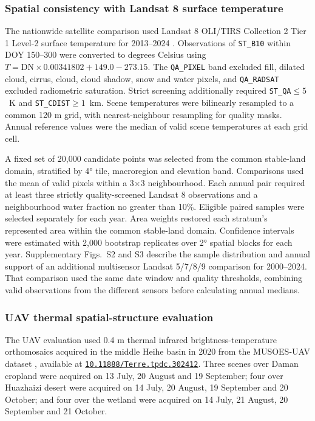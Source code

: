 \subsubsection{Spatial consistency with Landsat 8 surface temperature}

The nationwide satellite comparison used Landsat 8 OLI/TIRS Collection 2 Tier 1 Level-2 surface temperature for 2013--2024 \parencite{malakar2018landsatSt,ermida2020landsatGee,usgs2021collection2}. Observations of \texttt{ST\_B10} within DOY 150--300 were converted to degrees Celsius using $T=\mathrm{DN}\times0.00341802+149.0-273.15$. The \texttt{QA\_PIXEL} band excluded fill, dilated cloud, cirrus, cloud, cloud shadow, snow and water pixels, and \texttt{QA\_RADSAT} excluded radiometric saturation. Strict screening additionally required \texttt{ST\_QA}$\leq5$~K and \texttt{ST\_CDIST}$\geq1$~km. Scene temperatures were bilinearly resampled to a common 120 m grid, with nearest-neighbour resampling for quality masks. Annual reference values were the median of valid scene temperatures at each grid cell.

A fixed set of 20,000 candidate points was selected from the common stable-land domain, stratified by 4° tile, macroregion and elevation band. Comparisons used the mean of valid \chinatherm{} pixels within a 3$\times$3 neighbourhood. Each annual pair required at least three strictly quality-screened Landsat 8 observations and a neighbourhood water fraction no greater than 10\%. Eligible paired samples were selected separately for each year. Area weights restored each stratum's represented area within the common stable-land domain. Confidence intervals were estimated with 2,000 bootstrap replicates over 2° spatial blocks for each year. Supplementary Figs.~S2 and S3 describe the sample distribution and annual support of an additional multisensor Landsat 5/7/8/9 comparison for 2000--2024. That comparison used the same date window and quality thresholds, combining valid observations from the different sensors before calculating annual medians.

\subsubsection{UAV thermal spatial-structure evaluation}

The UAV evaluation used 0.4 m thermal infrared brightness-temperature orthomosaics acquired in the middle Heihe basin in 2020 from the MUSOES-UAV dataset \parencite{zhou2026musoes}, available at \href{https://doi.org/10.11888/Terre.tpdc.302412}{\nolinkurl{10.11888/Terre.tpdc.302412}}. Three scenes over Daman cropland were acquired on 13 July, 20 August and 19 September; four over Huazhaizi desert were acquired on 14 July, 20 August, 19 September and 20 October; and four over the wetland were acquired on 14 July, 21 August, 20 September and 21 October.

